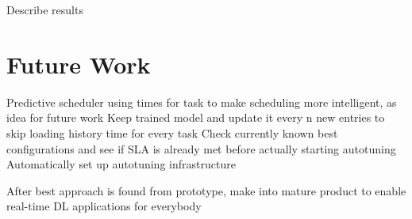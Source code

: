 Describe results

\section{Future Work}
Predictive scheduler using times for task to make scheduling more intelligent, as idea for future work
Keep trained model and update it every n new entries to skip loading history time for every task
Check currently known best configurations and see if SLA is already met before actually starting autotuning
Automatically set up autotuning infrastructure

After best approach is found from prototype, make into mature product to enable real-time DL applications for everybody